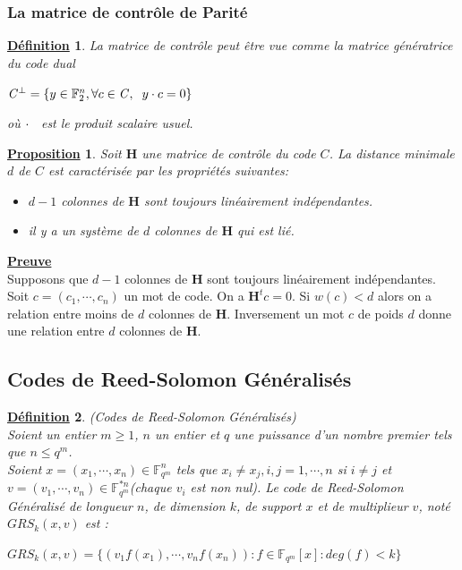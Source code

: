 \documentclass[12pt,openany]{report}
\newtheorem{proposition}{\underline{Proposition}}
\newtheorem{definition}{\underline{Définition}}
\begin{document}
\subsubsection{La matrice de contrôle de Parité}
\begin{definition}
La matrice de contrôle peut être vue comme la matrice génératrice du code dual
\begin{center}

$\mathit{C}^{\perp}=\left\lbrace y \in \mathbb{F}_2^{n}, \forall c \in \mathit{C}, \hspace{0,2cm} y \cdot c=0  \right\rbrace   $
\end{center}
où $ \cdot \hspace{0,2cm}$ est le produit scalaire usuel.
\end{definition}
\begin{proposition}
Soit $\mathbf{H}$ une matrice de contrôle du code $\mathit{C}$. La distance minimale $d$ de $\mathit{C}$ est caractérisée par les propriétés suivantes:
\begin{itemize}
\item[•] $d-1$ colonnes de $\mathbf{H}$ sont toujours linéairement indépendantes.
\item[•] il y a un système de $d$ colonnes de $\mathbf{H}$ qui est lié.
\end{itemize}
\end{proposition}
\textbf{\underline{Preuve}}\\ Supposons que $d-1$ colonnes de $\mathbf{H}$ sont toujours linéairement indépendantes.
Soit $c = (c_1,\cdots , c_n)$ un mot de code. On a $\mathbf{H}^tc = 0$. Si $w(c) < d$ alors on a relation entre moins de $d$ colonnes de $\mathbf{H}$. Inversement un mot $c$ de poids $d$ donne une relation entre $d$ colonnes de $\mathbf{H}$.

\subsection{Codes de Reed-Solomon Généralisés  }

\begin{definition} (Codes de Reed-Solomon Généralisés)\\
Soient un entier $m\geq 1$, $n$ un entier et $q$ une puissance d'un nombre premier tels que $n\leq q^m$.\\
Soient $x=(x_1,\cdots,x_n)\in \mathbb{F}_{q^m}^n$ tels que $ x_i \neq x_j, i, j=1, \cdots,n $ si $ i \neq j $ et $ v=(v_1,\cdots,v_n) \in \mathbb{F}_{q^m}^{*n}$(chaque $v_i$ est non nul). Le code de Reed-Solomon Généralisé de longueur $n$, de dimension $k$, de support $x$ et de multiplieur  $v$, noté $GRS_k (x,v)$ est :
\begin{center}
$ 
GRS_k(x,v)=\lbrace ( v_1f(x_1),\cdots,v_nf(x_n) ): f \in \mathbb{F}_{q^m}[x]: deg(f)<k \rbrace
$
\end{center}
\end{definition}
\end{document}
